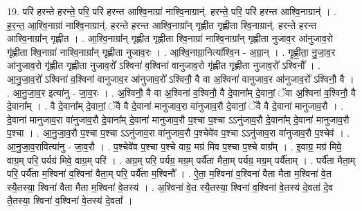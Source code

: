 \documentclass[17pt]{extarticle}
\begin{document}
19. परि॑ हरन्ते हरन्ते॒ परि॒ परि॑ हरन्त आश्वि॒नाग्रा॑ नाश्वि॒नाग्रान्॑. हरन्ते॒ परि॒ परि॑ हरन्त आश्वि॒नाग्रान्॑ । . ह॒र॒न्त॒ आ॒श्वि॒नाग्रा॑ नाश्वि॒नाग्रान्॑. हरन्ते हरन्त आश्वि॒नाग्रा᳚न् गृह्णीत गृह्णीता श्वि॒नाग्रान्॑. हरन्ते हरन्त आश्वि॒नाग्रा᳚न् गृह्णीत । . आ॒श्वि॒नाग्रा᳚न् गृह्णीत गृह्णीता श्वि॒नाग्रा॑ नाश्वि॒नाग्रा᳚न् गृह्णीता नुजाव॒र आ॑नुजाव॒रो गृ॑ह्णीता श्वि॒नाग्रा॑ नाश्वि॒नाग्रा᳚न् गृह्णीता नुजाव॒रः । . आ॒श्वि॒नाग्रा॒नित्या᳚श्वि॒न - अ॒ग्रा॒न् । . गृ॒ह्णी॒ता॒ नु॒जा॒व॒र आ॑नुजाव॒रो गृ॑ह्णीत गृह्णीता नुजाव॒रो᳚ ऽश्विना॑ व॒श्विना॑ वानुजाव॒रो गृ॑ह्णीत गृह्णीता नुजाव॒रो᳚ ऽश्विनौ᳚ । . आ॒नु॒जा॒व॒रो᳚ ऽश्विना॑ व॒श्विना॑ वानुजाव॒र आ॑नुजाव॒रो᳚ ऽश्विनौ॒ वै वा अ॒श्विना॑ वानुजाव॒र आ॑नुजाव॒रो᳚ ऽश्विनौ॒ वै । . आ॒नु॒जा॒व॒र इत्या॑नु - जा॒व॒रः । . अ॒श्विनौ॒ वै वा अ॒श्विना॑ व॒श्विनौ॒ वै दे॒वाना᳚म् दे॒वानां॒ ॅवा अ॒श्विना॑ व॒श्विनौ॒ वै दे॒वाना᳚म् । . वै दे॒वाना᳚म् दे॒वानां॒ ॅवै वै दे॒वाना॑ मानुजाव॒रा वा॑नुजाव॒रौ दे॒वानां॒ ॅवै वै दे॒वाना॑ मानुजाव॒रौ । . दे॒वाना॑ मानुजाव॒रा वा॑नुजाव॒रौ दे॒वाना᳚म् दे॒वाना॑ मानुजाव॒रौ प॒श्चा प॒श्चा ऽऽनु॑जाव॒रौ दे॒वाना᳚म् दे॒वाना॑ मानुजाव॒रौ प॒श्चा । . आ॒नु॒जा॒व॒रौ प॒श्चा प॒श्चा ऽऽनु॑जाव॒रा वा॑नुजाव॒रौ प॒श्चेवे॑व प॒श्चा ऽऽनु॑जाव॒रा वा॑नुजाव॒रौ प॒श्चेव॑ । . आ॒नु॒जा॒व॒रावित्या॑नु - जा॒व॒रौ । . प॒श्चेवे॑व प॒श्चा प॒श्चे वाग्र॒ मग्र॑ मिव प॒श्चा प॒श्चे वाग्र᳚म् । . इ॒वाग्र॒ मग्र॑ मिवे॒ वाग्र॒म् परि॒ पर्यग्र॑ मिवे॒ वाग्र॒म् परि॑ । . अग्र॒म् परि॒ पर्यग्र॒ मग्र॒म् पर्यै॑ता मैता॒म् पर्यग्र॒ मग्र॒म् पर्यै॑ताम् । . पर्यै॑ता मैता॒म् परि॒ पर्यै॑ता म॒श्विना॑ व॒श्विना॑ वैता॒म् परि॒ पर्यै॑ता म॒श्विनौ᳚ । . ऐ॒ता॒ म॒श्विना॑ व॒श्विना॑ वैता मैता म॒श्विना॑ वे॒त स्यै॒तस्या॒ श्विना॑ वैता मैता म॒श्विना॑ वे॒तस्य॑ । . अ॒श्विना॑ वे॒त स्यै॒तस्या॒ श्विना॑ व॒श्विना॑ वे॒तस्य॑ दे॒वता॑ दे॒व तै॒तस्या॒ श्विना॑ व॒श्विना॑ वे॒तस्य॑ दे॒वता᳚ । \newline
\end{document}
